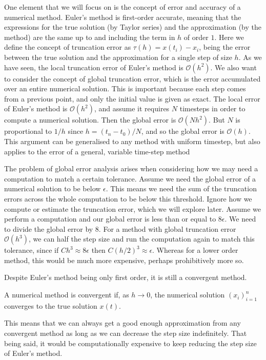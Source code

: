 One element that we will focus on is the concept of error and accuracy of a numerical method.
Euler's method is first-order accurate, meaning that the expressions for the true solution (by Taylor series) and the approximation (by the method) are the same up to and including the term in $h$ of order $1$.
Here we define the concept of truncation error as $\tau(h) = x(t_i) - x_i$, being the error between the true solution and the approximation for a single step of size $h$.
As we have seen, the local truncation error of Euler's method is $\mathcal{O}(h^2)$.
We also want to consider the concept of global truncation error, which is the error accumulated over an entire numerical solution.
This is important because each step comes from a previous point, and only the initial value is given as exact. %
The local error of Euler's method is $\mathcal{O}(h^2)$, and assume it requires $N$ timesteps in order to compute a numerical solution.
Then the global error is $\mathcal{O}(Nh^2)$. But $N$ is proportional to $1/h$ since $h = (t_n - t_0)/N$, and so the global error is $\mathcal{O}(h)$.
This argument can be generalised to any method with uniform timestep, but also applies to the error of a general, variable time-step method \cite{hairerwanner1993}

The problem of global error analysis arises when considering how we may need a computation to match a certain tolerance.
Assume we need the global error of a numerical solution to be below $\epsilon$.
This means we need the sum of the truncation errors across the whole computation to be below this threshold.
Ignore how we compute or estimate the truncation error, which we will explore later.
Assume we perform a computation and our global error is less than or equal to $8 \epsilon$.
We need to divide the global error by $8$. For a method with global truncation error $\mathcal{O}(h^3)$,
we can half the step size and run the computation again to match this tolerance, since if $C h^3 \approx 8 \epsilon$ then $C (h/2)^3 \approx \epsilon$.
Whereas for a lower order method, this would be much more expensive, perhaps prohibitively more so.

Despite Euler's method being only first order, it is still a convergent method.
\begin{definition}
    A numerical method is convergent if, as $h \rightarrow 0$, the numerical solution $(x_i)_{i=1}^{n}$ converges to the true solution $x(t)$. 
\end{definition}
This means that we can always get a good enough approximation from any convergent method as long as we can decrease the step size indefinitely.
That being said, it would be computationally expensive to keep reducing the step size of Euler's method.


